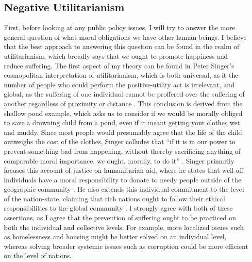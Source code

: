 \documentclass[12pt]{article}
\begin{document}
\subsection*{Negative Utilitarianism}
First, before looking at any public policy issues, I will try to answer the more general question of what moral obligations we have other human beings.
I believe that the best approach to answering this question can be found in the realm of utilitarianism, which broadly says that we ought to promote happiness and reduce suffering.
The first aspect of my theory can be found in Peter Singer's cosmopolitan interpretation of utilitarianism, which is both universal, as it the number of people who could perform the positive-utility act is irrelevant, and global, as the suffering of one individual cannot be proffered over the suffering of another regardless of proximity or distance \autocite[154]{widdows2012}.
This conclusion is derived from the shallow pond example, which asks us to consider if we would be morally obliged to save a drowning child from a pond, even if it meant getting your clothes wet and muddy.
Since most people would presumably agree that the life of the child outweighs the cost of the clothes, Singer colludes that ``if it is in our power to prevent something bad from happening, without thereby sacrificing anything of comparable moral importance, we ought, morally, to do it'' \autocite[153]{widdows2012}.
Singer primarily focuses this account of justice on humanitarian aid, where he states that well-off individuals have a moral responsibility to donate to needy people outside of the geographic community \autocite[155]{widdows2012}.
He also extends this individual commitment to the level of the nation-state, claiming that rich nations ought to follow their ethical responsibilities to the global community \autocite[15]{singer2016}.
I strongly agree with both of these assertions, as I agree that the prevention of suffering ought to be practiced on both the individual and collective levels.
For example, more localized issues such as homelessness and housing might be better solved on an individual level, whereas solving broader systemic issues such as corruption could be more efficient on the level of nations.
\end{document}
